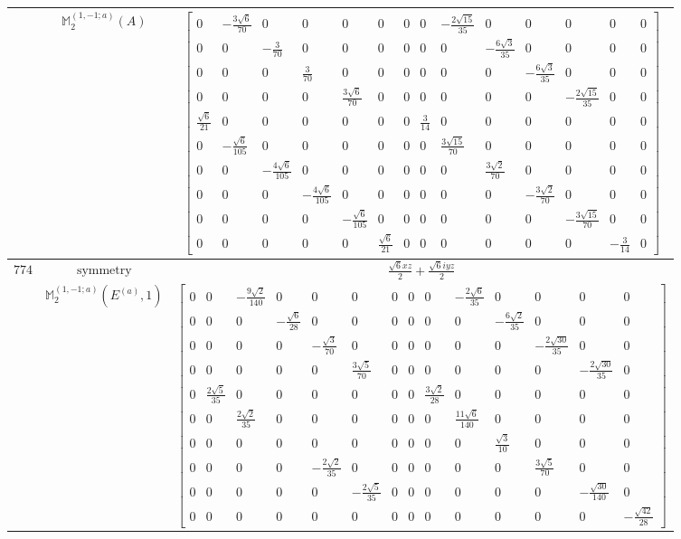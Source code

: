 \documentclass[fleqn,8pt,landscape]{jsarticle}
\begin{document}
\begin{longtable}{ccc}
$  $ & $ \mathbb{M}_{2}^{(1,-1;a)}(A) $ & $ \begin{bmatrix} 0 & - \frac{3 \sqrt{6}}{70} & 0 & 0 & 0 & 0 & 0 & 0 & - \frac{2 \sqrt{15}}{35} & 0 & 0 & 0 & 0 & 0 \\ 0 & 0 & - \frac{3}{70} & 0 & 0 & 0 & 0 & 0 & 0 & - \frac{6 \sqrt{3}}{35} & 0 & 0 & 0 & 0 \\ 0 & 0 & 0 & \frac{3}{70} & 0 & 0 & 0 & 0 & 0 & 0 & - \frac{6 \sqrt{3}}{35} & 0 & 0 & 0 \\ 0 & 0 & 0 & 0 & \frac{3 \sqrt{6}}{70} & 0 & 0 & 0 & 0 & 0 & 0 & - \frac{2 \sqrt{15}}{35} & 0 & 0 \\ \frac{\sqrt{6}}{21} & 0 & 0 & 0 & 0 & 0 & 0 & \frac{3}{14} & 0 & 0 & 0 & 0 & 0 & 0 \\ 0 & - \frac{\sqrt{6}}{105} & 0 & 0 & 0 & 0 & 0 & 0 & \frac{3 \sqrt{15}}{70} & 0 & 0 & 0 & 0 & 0 \\ 0 & 0 & - \frac{4 \sqrt{6}}{105} & 0 & 0 & 0 & 0 & 0 & 0 & \frac{3 \sqrt{2}}{70} & 0 & 0 & 0 & 0 \\ 0 & 0 & 0 & - \frac{4 \sqrt{6}}{105} & 0 & 0 & 0 & 0 & 0 & 0 & - \frac{3 \sqrt{2}}{70} & 0 & 0 & 0 \\ 0 & 0 & 0 & 0 & - \frac{\sqrt{6}}{105} & 0 & 0 & 0 & 0 & 0 & 0 & - \frac{3 \sqrt{15}}{70} & 0 & 0 \\ 0 & 0 & 0 & 0 & 0 & \frac{\sqrt{6}}{21} & 0 & 0 & 0 & 0 & 0 & 0 & - \frac{3}{14} & 0 \end{bmatrix} $ \\ \hline
$ 774 $ & $ \text{symmetry} $ & $ \frac{\sqrt{6} x z}{2} + \frac{\sqrt{6} i y z}{2} $ \\
$  $ & $ \mathbb{M}_{2}^{(1,-1;a)}(E^{(a)},1) $ & $ \begin{bmatrix} 0 & 0 & - \frac{9 \sqrt{2}}{140} & 0 & 0 & 0 & 0 & 0 & 0 & - \frac{2 \sqrt{6}}{35} & 0 & 0 & 0 & 0 \\ 0 & 0 & 0 & - \frac{\sqrt{6}}{28} & 0 & 0 & 0 & 0 & 0 & 0 & - \frac{6 \sqrt{2}}{35} & 0 & 0 & 0 \\ 0 & 0 & 0 & 0 & - \frac{\sqrt{3}}{70} & 0 & 0 & 0 & 0 & 0 & 0 & - \frac{2 \sqrt{30}}{35} & 0 & 0 \\ 0 & 0 & 0 & 0 & 0 & \frac{3 \sqrt{5}}{70} & 0 & 0 & 0 & 0 & 0 & 0 & - \frac{2 \sqrt{30}}{35} & 0 \\ 0 & \frac{2 \sqrt{5}}{35} & 0 & 0 & 0 & 0 & 0 & 0 & \frac{3 \sqrt{2}}{28} & 0 & 0 & 0 & 0 & 0 \\ 0 & 0 & \frac{2 \sqrt{2}}{35} & 0 & 0 & 0 & 0 & 0 & 0 & \frac{11 \sqrt{6}}{140} & 0 & 0 & 0 & 0 \\ 0 & 0 & 0 & 0 & 0 & 0 & 0 & 0 & 0 & 0 & \frac{\sqrt{3}}{10} & 0 & 0 & 0 \\ 0 & 0 & 0 & 0 & - \frac{2 \sqrt{2}}{35} & 0 & 0 & 0 & 0 & 0 & 0 & \frac{3 \sqrt{5}}{70} & 0 & 0 \\ 0 & 0 & 0 & 0 & 0 & - \frac{2 \sqrt{5}}{35} & 0 & 0 & 0 & 0 & 0 & 0 & - \frac{\sqrt{30}}{140} & 0 \\ 0 & 0 & 0 & 0 & 0 & 0 & 0 & 0 & 0 & 0 & 0 & 0 & 0 & - \frac{\sqrt{42}}{28} \end{bmatrix} $ \\ \hline

\end{longtable}
\end{document}
